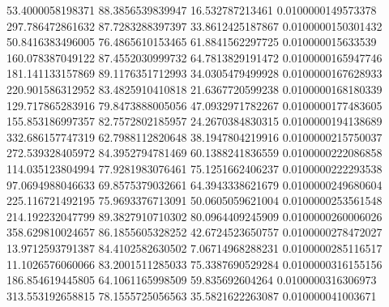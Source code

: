         53.4000058198371        88.3856539839947         16.532787213461      0.0100000149573378
        297.786472861632        87.7283288397397        33.8612425187867      0.0100000150301432
        50.8416383496005        76.4865610153465        61.8841562297725       0.010000015633539
        160.078387049122        87.4552030999732        64.7813829191472      0.0100000165947746
        181.141133157869        89.1176351712993        34.0305479499928      0.0100000167628933
        220.901586312952        83.4825910410818        21.6367720599238      0.0100000168180339
        129.717865283916        79.8473888005056        47.0932971782267      0.0100000177483605
        155.853186997357        82.7572802185957        24.2670384830315      0.0100000194138689
        332.686157747319        62.7988112820648        38.1947804219916      0.0100000215750037
        272.539328405972        84.3952794781469        60.1388241836559      0.0100000222086858
        114.035123804994        77.9281983076461        75.1251662406237      0.0100000222293538
        97.0694988046633        69.8575379032661        64.3943338621679      0.0100000249680604
        225.116721492195        75.9693376713091        50.0605059621004      0.0100000253561548
        214.192232047799        89.3827910710302        80.0964409245909      0.0100000260006026
        358.629810024657        86.1855605328252        42.6724523650757      0.0100000278472027
        13.9712593791387        84.4102582630502        7.06714968288231      0.0100000285116517
        11.1026576060066        83.2001511285033        75.3387690529284      0.0100000316155156
        186.854619445805        64.1061165998509         59.835692604264      0.0100000316306973
        313.553192658815        78.1555725056563        35.5821622263087       0.010000041003671
